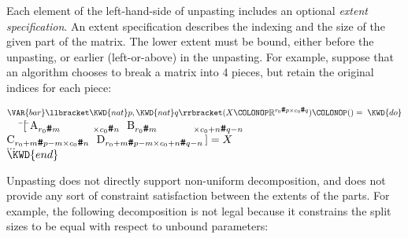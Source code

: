 Each element of the left-hand-side of unpasting
includes an optional \emph{extent specification}.
An extent specification
describes the indexing and the size of the given part of the matrix.
The lower extent must be bound, either before
the unpasting, or earlier (left-or-above) in the unpasting.
For example, suppose that an algorithm
chooses to break a matrix into 4 pieces,
but retain the original indices for each piece:
\begin{Fortress}
\(\VAR{bar}\llbracket\KWD{nat} p, \KWD{nat} q\rrbracket(X\COLONOP\mathbb{R}^{r_0\mathinner{\hbox{\tt\char'43}}p \times c_{0}\mathinner{\hbox{\tt\char'43}}q})\COLONOP() = \;\KWD{do}\)\\
{\tt~~~}\pushtabs\=\+\(
[\,\null\)\pushtabs\=\+\(\mathrm{A}_{r_0\mathinner{\hbox{\tt\char'43}}m~~~~~~~~~\times
         c_{0}\mathinner{\hbox{\tt\char'43}}n}~~\mathrm{B}_{r_0\mathinner{\hbox{\tt\char'43}}m~~~~~~~~~~\times c_{0}+n\mathinner{\hbox{\tt\char'43}}q-n}\)\\
\(     \mathrm{C}_{r_0+m\mathinner{\hbox{\tt\char'43}}p-m \times c_{0}\mathinner{\hbox{\tt\char'43}}n}~~\mathrm{D}_{r_0+m\mathinner{\hbox{\tt\char'43}}p-m \times c_{0}+n\mathinner{\hbox{\tt\char'43}}q-n}\,] = X\)\-\\\poptabs
\(   \ldots\)\-\\\poptabs
\(\KWD{end}\)
\end{Fortress}

Unpasting does not directly support non-uniform
decomposition, and does not provide any sort of constraint
satisfaction between the extents of the parts.  For example, the following
decomposition is not legal because it constrains the split sizes to be
equal with respect to unbound  parameters:

